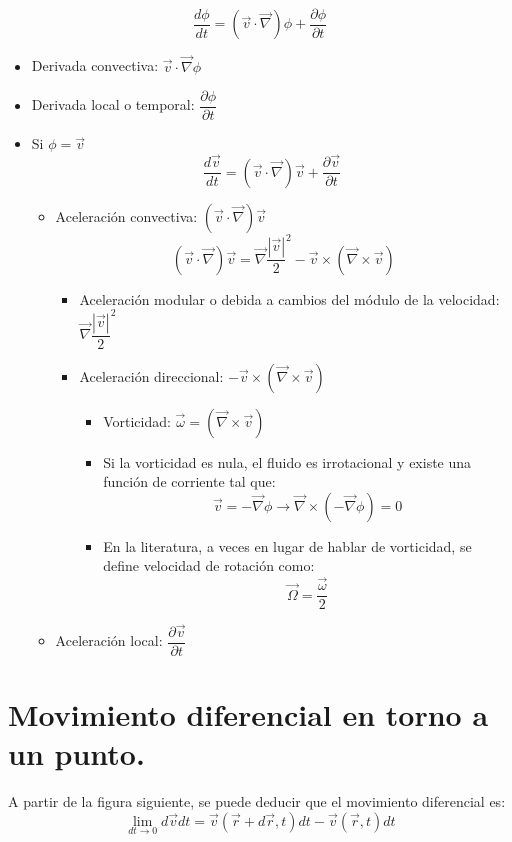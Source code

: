 \[\dfrac{d\phi}{dt}=\left(\vec{v} \cdot\vec{\nabla}\right)\phi +\dfrac{\partial \phi}{\partial t} \]
\begin{itemize}
	\item Derivada convectiva: $\vec{v} \cdot\vec{\nabla}\phi$
	\item Derivada local o temporal: $\dfrac{\partial \phi}{\partial t}$
	\item Si $\phi = \vec{v}$
	\[\dfrac{d\vec{v}}{dt}=(\vec{v} \cdot\vec{\nabla})\vec{v}+\dfrac{\partial \vec v}{\partial t} \]
	\begin{itemize}
		\item Aceleración convectiva: $(\vec{v} \cdot\vec{\nabla})\vec{v}$
		\[(\vec{v} \cdot\vec{\nabla})\vec{v}=\vec{\nabla}\dfrac{|\vec{v}|}{2}^2-\vec{v} \times \left(\vec{\nabla}\times\vec{v}\right)\]
		\begin{itemize}
			\item Aceleración modular o debida a cambios del módulo de la velocidad: $\vec{\nabla}\dfrac{|\vec{v}|}{2}^2$
			\item Aceleración direccional: $-\vec{v} \times \left(\vec{\nabla}\times\vec{v}\right)$
			\begin{itemize}
				\item Vorticidad: $\vec{\omega}= \left(\vec{\nabla}\times\vec{v}\right)$
			
				\item Si la vorticidad es nula, el fluido es irrotacional y existe una función de corriente tal que:
				\[\vec{v}=-\vec{\nabla}\phi \rightarrow \vec{\nabla}\times\left(-\vec{\nabla}\phi\right)=0\]
				\item  En la literatura, a veces en lugar de hablar de vorticidad, se define velocidad de rotación como:
				\[\vec{\Omega}=\dfrac{\vec{\omega}}{2}\]
			\end{itemize}
		\end{itemize}
		\item Aceleración local: $\dfrac{\partial \vec v}{\partial t}$
	\end{itemize}
\end{itemize}
\newpage
\section{Movimiento diferencial en torno a un punto.}
A partir de la figura siguiente, se puede deducir que el movimiento diferencial es:
\[\lim_{{dt \to 0}} d\vec{v}dt=\vec{v}(\vec{r}+d\vec{r},t)dt-\vec{v}(\vec r ,t)dt\]


